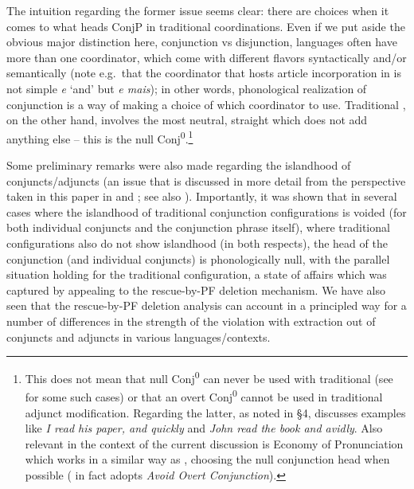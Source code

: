\documentclass[output=paper]{langsci/langscibook}
\begin{document}
\largerpage[-2]
The intuition regarding the former issue seems clear: there are choices when it
comes to what heads ConjP in traditional coordinations. Even if we put aside the
obvious major distinction here, conjunction vs disjunction, languages often
have more than one coordinator, which come with different flavors syntactically
and/or semantically (note e.g.\ that the coordinator that hosts article
incorporation in  is not simple \emph{e} ‘and’ but \emph{e mais}); in
other words, phonological realization of conjunction is a way of making a
choice of which coordinator to use. Traditional , on the other
hand, involves the most neutral, straight  which does not add
anything else – this is the null Conj\textsuperscript{0}.\footnote{This does
    not mean that null Conj\textsuperscript{0} can never be used with
    traditional  (see \citealt{Progovac1999} for some such
    cases) or that an overt Conj\textsuperscript{0} cannot be used in
    traditional adjunct modification.  Regarding the latter, as noted in §4,
    \textcite{Progovac1998,Progovac1999} discusses examples like \emph{I read
    his paper, and quickly} and \emph{John read the book and avidly}. Also
    relevant in the context of the current discussion is 
    Economy of Pronunciation which works in a similar way as
     \emph{}, choosing the
    null conjunction head when possible (\citealt{Progovac1998} in fact adopts
\emph{Avoid Overt Conjunction}).\label{fn:27}}

Some preliminary remarks were also made regarding the islandhood of
conjuncts/adjuncts (an issue that is discussed in more detail from the
perspective taken in this paper in \citealt{Odainpress} and
\citealt{Boskovic2017}; see also \citealt{Boskovicinprep}). Importantly, it was
shown that in several cases where the islandhood of traditional conjunction
configurations is voided (for both individual conjuncts and the conjunction
phrase itself), where traditional  configurations also do not show
islandhood (in both respects), the head of the conjunction (and individual
conjuncts) is phonologically null, with the parallel situation holding for the
traditional  configuration, a state of affairs which was
captured by appealing to the rescue-by-\gls{PF} deletion mechanism. We have
also seen that the rescue-by-PF deletion analysis can account in a principled
way for a number of differences in the strength of the violation with
extraction out of conjuncts and adjuncts in various
languages/contexts.
\end{document}
